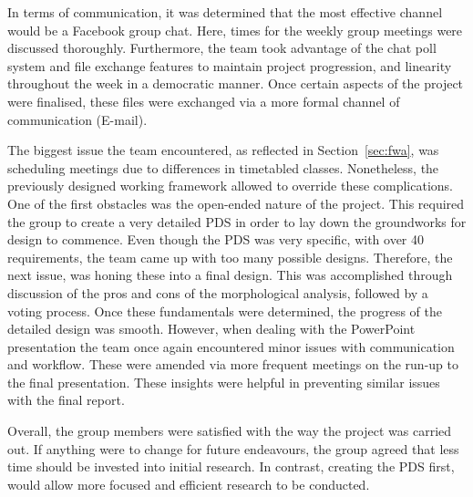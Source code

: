 \documentclass[a4paper,11pt]{article}
\begin{document}
In terms of communication, it was determined that the most effective channel would be a Facebook group chat. Here, times for the weekly group meetings were discussed thoroughly. Furthermore, the team took advantage of the chat poll system and file exchange features to maintain project progression, and linearity throughout the week in a democratic manner. Once certain aspects of the project were finalised, these files were exchanged via a more formal channel of communication (E-mail). 

The biggest issue the team encountered, as reflected in Section~\ref{sec:fwa}, was scheduling meetings due to differences in timetabled classes. Nonetheless, the previously designed working framework allowed to override these complications. One of the first obstacles was the open-ended nature of the project. This required the group to create a very detailed PDS in order to lay down the groundworks for design to commence. Even though the PDS was very specific, with over 40 requirements, the team came up with too many possible designs. Therefore, the next issue, was honing these into a final design. This was accomplished through discussion of the pros and cons of the morphological analysis, followed by a voting process. Once these fundamentals were determined, the progress of the detailed design was smooth. However, when dealing with the PowerPoint presentation the team once again encountered minor issues with communication and workflow. These were amended via more frequent meetings on the run-up to the final presentation. These insights were helpful in preventing similar issues with the final report. 

Overall, the group members were satisfied with the way the project was carried out. If anything were to change for future endeavours, the group agreed that less time should be invested into initial research. In contrast, creating the PDS first, would allow more focused and efficient research to be conducted. 


\sloppy




\nocite{shi}
\nocite{bosch16}
\nocite{sw}
\end{document}
